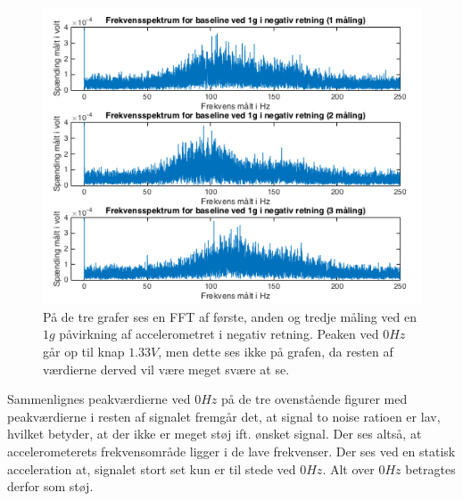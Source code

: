 \begin{figure}[H]
	\centering
	\includegraphics[scale=0.5]{figures/cProblemloesning/Pilotforsoeg_FrekvensN.png}
	\caption{På de tre grafer ses en FFT af første, anden og tredje måling ved en $1g$ påvirkning af accelerometret i negativ retning. Peaken ved $0Hz$ går op til knap $1.33V$, men dette ses ikke på grafen, da resten af værdierne derved vil være meget svære at se.}
	\label{Fig:Pilot_FFTN}
\end{figure}

\noindent Sammenlignes peakværdierne ved $0Hz$ på de tre ovenstående figurer med peakværdierne i resten af signalet fremgår det, at signal to noise ratioen er lav, hvilket betyder, at der ikke er meget støj ift. ønsket signal. Der ses altså, at accelerometerets frekvensområde ligger i de lave frekvenser. Der ses ved en statisk acceleration at, signalet stort set kun er til stede ved $0Hz$. Alt over $0Hz$ betragtes derfor som støj. 

